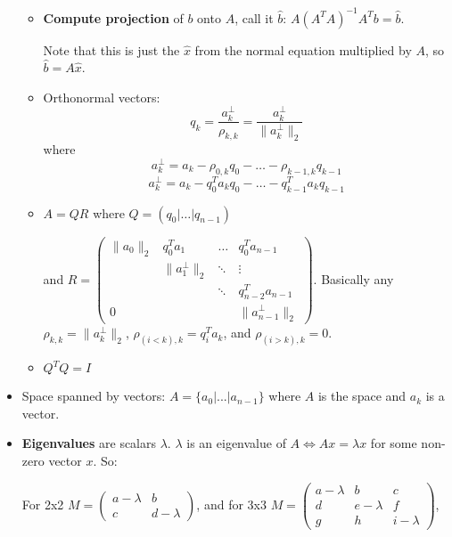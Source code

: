 \documentclass[a4paper]{article}
\begin{document}
\begin{itemize}
\begin{itemize}
                \item \textbf{Compute projection} of \( b \) onto \(A\), call it \(\hat{b}\): \(A(A^TA)^{−1}A^Tb=\hat{b}\).
                
                Note that this is just the \(\hat{x}\) from the normal equation multiplied by \(A\), so \(\hat{b}=A\hat{x}\).
                
                \item Orthonormal vectors: $$q_k=\frac{a^\bot _k}{\rho _{k,k}}=\frac{a^{\bot }_k}{\parallel a^{\bot }_k \parallel _2}$$ where
                    $$a^\bot _k = a_k − \rho _{0,k}q_0− \dots −\rho _{k−1,k}q_{k−1}$$
                    $$a^\bot _k=a_k−q^T_0a_kq_0−\dots −q^T_{k−1}a_kq_{k−1}$$
                    
                \item \(A=QR\) where \(Q=(q_0 | \dots | q_{n-1})\)
                
                    and \(R=
                        \begin{pmatrix}
                        \parallel a_0 \parallel _2 & q_0^Ta_1 & \dots & q_0^Ta_{n-1} \\
                        & \parallel a_1^{\bot } \parallel _2 & \ddots & \vdots \\
                        & & \ddots & q_{n-2}^Ta_{n-1} \\
                        0 & & & \parallel a^{\bot }_{n-1} \parallel _2
                        \end{pmatrix}
                    \). Basically any \(\rho _{k,k}=\parallel a_k^{\bot } \parallel _2 \),
                    \(\rho _{(i<k),k}=q_i^Ta_k\), and \(\rho _{(i>k),k}=0\).
                \item \(Q^TQ=I\)
            \end{itemize}
        \item Space spanned by vectors: \(A=\{ a_0|\text{...}|a_{n−1}\} \) where \(A\) is the space and \(a_k\) is a vector.
        \item \textbf{Eigenvalues} are scalars \(\lambda \). \(\lambda\) is an eigenvalue of \(A \iff Ax = \lambda x\) for some non-zero vector \(x\). So:
        
            For 2x2 \(M =
                \begin{pmatrix}
                    a-\lambda & b \\
                    c & d-\lambda 
                \end{pmatrix}\), and for 3x3 \( M =
                \begin{pmatrix}
                    a-\lambda & b & c \\
                    d & e-\lambda & f \\
                    g & h & i-\lambda 
                \end{pmatrix} \),
                

\end{itemize}
\end{document}
